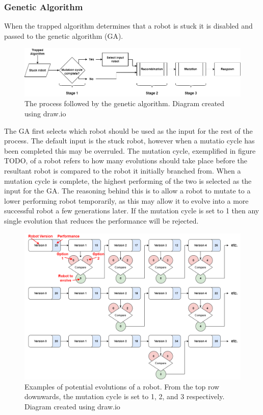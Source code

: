 \documentclass{article}
\begin{document}
\subsubsection{Genetic Algorithm}
When the trapped algorithm determines that a robot is stuck it is disabled and passed to the genetic algorithm (GA).\\
\begin{figure}[H]
\centering
\includegraphics[scale=0.4]{gaProcess}
\caption{The process followed by the genetic algorithm. Diagram created using draw.io \citep{drawio}}
\end{figure}
The GA first selects which robot should be used as the input for the rest of the process. The default input is the stuck robot, however when a mutatio cycle has been completed this may be overruled. The mutation cycle, exemplified in figure TODO, of a robot refers to how many evolutions should take place before the resultant robot is compared to the robot it initially branched from. When a mutation cycle is complete, the highest performing of the two is selected as the input for the GA. The reasoning behind this is to allow a robot to mutate to a lower performing robot temporarily, as this may allow it to evolve into a more successful robot a few generations later. If the mutation cycle is set to 1 then any single evolution that reduces the performance will be rejected.\\
\begin{figure}[H]
\centering
\includegraphics[scale=0.4]{mutationCycle}
\caption{Examples of potential evolutions of a robot. From the top row downwards, the mutation cycle is set to 1, 2, and 3 respectively. Diagram created using draw.io \citep{drawio}}
\end{figure}
\end{document}
